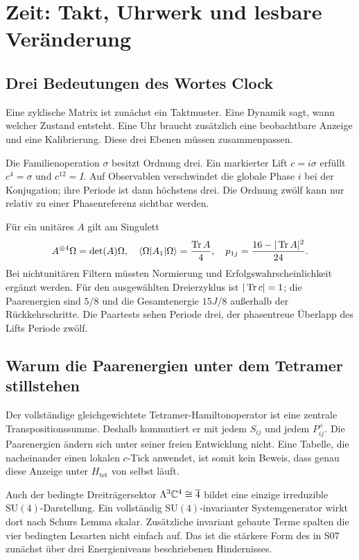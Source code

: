 \chapter{Zeit: Takt, Uhrwerk und lesbare Veränderung}
\label{ch:zeit}
\section{Drei Bedeutungen des Wortes Clock}
Eine zyklische Matrix ist zunächst ein Taktmuster. Eine Dynamik sagt, wann welcher Zustand entsteht. Eine Uhr braucht zusätzlich eine beobachtbare Anzeige und eine Kalibrierung. Diese drei Ebenen müssen zusammenpassen.

Die Familienoperation $\sigma$ besitzt Ordnung drei. Ein markierter Lift $c=i\sigma$ erfüllt $c^4=\sigma$ und $c^{12}=I$. Auf Observablen verschwindet die globale Phase $i$ bei der Konjugation; ihre Periode ist dann höchstens drei. Die Ordnung zwölf kann nur relativ zu einer Phasenreferenz sichtbar werden.

Für ein unitäres $A$ gilt am Singulett
\begin{equation}
A^{\otimes4}\Omega=\det(A)\Omega,
\quad\langle\Omega\rvert A_1\lvert\Omega\rangle=\frac{\operatorname{Tr} A}{4},
\quad p_{1j}=\frac{16-|\operatorname{Tr} A|^2}{24}.
\end{equation}
Bei nichtunitären Filtern müssten Normierung und Erfolgswahrscheinlichkeit ergänzt werden. Für den ausgewählten Dreierzyklus ist $|\operatorname{Tr} c|=1$; die Paarenergien sind $5/8$ und die Gesamtenergie $15J/8$ außerhalb der Rückkehrschritte. Die Paartests sehen Periode drei, der phasentreue Überlapp des Lifts Periode zwölf. 

\section{Warum die Paarenergien unter dem Tetramer stillstehen}
Der vollständige gleichgewichtete Tetramer-Hamiltonoperator ist eine zentrale Transpositionssumme. Deshalb kommutiert er mit jedem $S_{ij}$ und jedem $P^+_{ij}$. Die Paarenergien ändern sich unter seiner freien Entwicklung nicht. Eine Tabelle, die nacheinander einen lokalen $c$-Tick anwendet, ist somit kein Beweis, dass genau diese Anzeige unter $H_{\mathrm{tet}}$ von selbst läuft.

Auch der bedingte Dreiträgersektor $\Lambda^3\mathbb C^4\cong\overline4$ bildet eine einzige irreduzible $\mathrm{SU}(4)$-Darstellung. Ein vollständig $\mathrm{SU}(4)$-invarianter Systemgenerator wirkt dort nach Schurs Lemma skalar. Zusätzliche invariant gebaute Terme spalten die vier bedingten Lesarten nicht einfach auf. Das ist die stärkere Form des in S07 zunächst über drei Energieniveaus beschriebenen Hindernisses.

